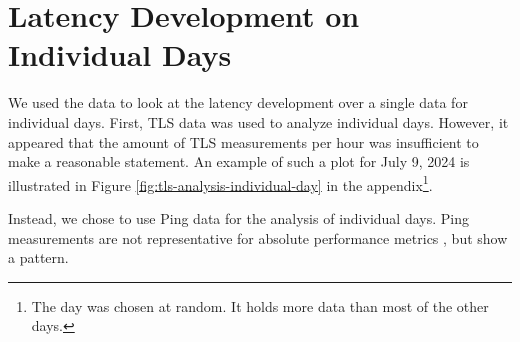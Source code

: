 \section{Latency Development on Individual Days} \label{sec:latency-individual-days}

We used the data to look at the latency development over a single data for individual days.
First, TLS data was used to analyze individual days. However, it appeared that the amount of TLS measurements per hour was insufficient to make a reasonable statement. An example of such a plot for July 9, 2024 is illustrated in Figure \ref{fig:tls-analysis-individual-day} in the appendix\footnote{The day was chosen at random. It holds more data than most of the other days.}.

Instead, we chose to use Ping data for the analysis of individual days. Ping measurements are not representative for absolute performance metrics \cite{DBLP:conf/imc/PelsserCVB13}, but show a pattern.


